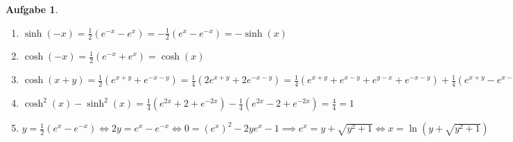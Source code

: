 \documentclass[a4paper,11pt,parskip=half,fleqn]{scrartcl}
\theoremstyle{note}
\newtheorem{aufgabe}{Aufgabe}
\begin{document}
\begin{aufgabe}
\begin{enumerate}
    \item $\sinh(-x)=\frac{1}{2}(e^{-x}-e^x)=-\frac{1}{2}(e^x-e^{-x})=-\sinh(x)$
    \item $\cosh(-x)=\frac{1}{2}(e^{-x}+e^x)=\cosh(x)$
    \item $\cosh(x+y)=\frac{1}{2}(e^{x+y}+e^{-x-y})=\frac{1}{4}(2e^{x+y}+2e^{-x-y})=\frac{1}{4}(e^{x+y}+e^{x-y}+e^{y-x}+e^{-x-y})+
      \frac{1}{4}(e^{x+y}-e^{x-y}-e^{y-x}+e^{-x-y})=\cosh(x)\cosh(y)+\sinh(x)\sinh(y)$
    \item $\cosh^2(x)-\sinh^2(x)=\frac{1}{4}(e^{2x}+2+e^{-2x})-\frac{1}{4}(e^{2x}-2+e^{-2x})=\frac{4}{4}=1$
    \item $y=\frac{1}{2}(e^x-e^{-x})\iff 2y=e^x-e^{-x}\iff 0=(e^x)^2-2ye^x-1\implies e^x=y+\sqrt{y^2+1}\iff x=\ln(y+\sqrt{y^2+1})$
  \end{enumerate}
\end{aufgabe}
\end{document}
